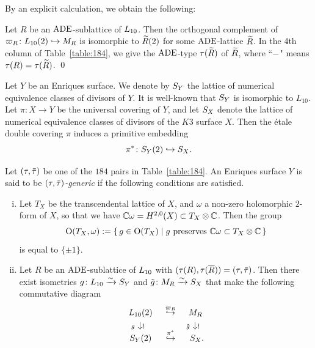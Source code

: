 \documentclass{amsart}
\numberwithin{procedure}{section}
\begin{document}
%
%
By an explicit calculation, we obtain the following:
%
\begin{proposition}\label{prop:Rtil}
Let $R$ be an $\mathord{\rm ADE}$-sublattice of $L_{10}$.
Then the orthogonal complement of $\varpi_R \colon L_{10} (2) \hookrightarrow M_R$
is isomorphic to $\widetilde{R}(2)$ for some 
$\mathord{\rm ADE}$-lattice $\widetilde{R}$.
In the 4th column of Table~\ref{table:184}, 
we give the $\mathord{\rm ADE}$-type $\tau(\widetilde{R})$ of  $\widetilde{R}$,
where  ``$-$" means $\tau(R)=\tau(\widetilde{R})$. %
\qed
\end{proposition}
%
Let $Y$ be an Enriques surface.
We denote by $S_{Y}$ the lattice of numerical equivalence classes of
divisors of  $Y$.
It is well-known that $S_{Y}$ is isomorphic to 
$L_{10}$.
Let $\pi\colon X\to Y$ be the universal covering of $Y$,
and let $S_{X}$ denote the lattice of numerical equivalence classes of
divisors of the $K3$ surface $X$.
Then the \'etale double covering $\pi$ induces a primitive embedding
\[
\pi^*\colon S_{Y}(2)\hookrightarrow S_{X}.
\]
%
\begin{definition}\label{def:tautaubargeneric}
Let $(\tau, \bar{\tau})$ be one of the $184$ pairs in Table~\ref{table:184}.
An Enriques surface $Y$ is said to be \emph{$(\tau, \bar{\tau})$-generic} 
if the following conditions are satisfied.
%
\begin{enumerate}[(i)]
\item 
Let $T_X$ be the transcendental lattice of $X$,
and $\omega$ a non-zero holomorphic $2$-form of $X$,
so that we have $\mathord{\mathbb C}\omega=H^{2, 0}(X) \subset T_X\otimes\mathord{\mathbb C}$.
Then the group
\[
\mathord{\mathrm{O}}(T_X, \omega):=\{\,{g\in \mathord{\mathrm{O}}(T_X)}\mid {\textrm{$g$ preserves
$\mathord{\mathbb C}\omega\subset T_X\otimes\mathord{\mathbb C}$}} \,\}
\]
is equal to $\{\pm 1\}$.
\item 
Let $R$ be an $\mathord{\rm ADE}$-sublattice of $L_{10}$ with $(\tau(R), \tau(\overline{R}))=(\tau, \bar{\tau})$.
Then there exist isometries $g\colon L_{10}\xrightarrow{\sim} S_Y$
and $\tilde{g}\colon M_R\xrightarrow{\sim} S_X$
that  make 
the following commutative diagram
\begin{equation}\label{eq:generic-diagram}
\begin{array}{ccc}
\Lten (2) &\maprightinjsp{\embLM_R}  & M_R
\mystruth{12pt} \\
\llap{\scriptsize $g$\;}\downisom &&  \llap{\scriptsize $\tilde{g}$\;}\downisom \\
S_Y(2) &\maprightinjsp{\pi^*} & S_X \rlap{.}
\end{array}
\end{equation}
\end{enumerate}
%
\end{definition}
\end{document}
